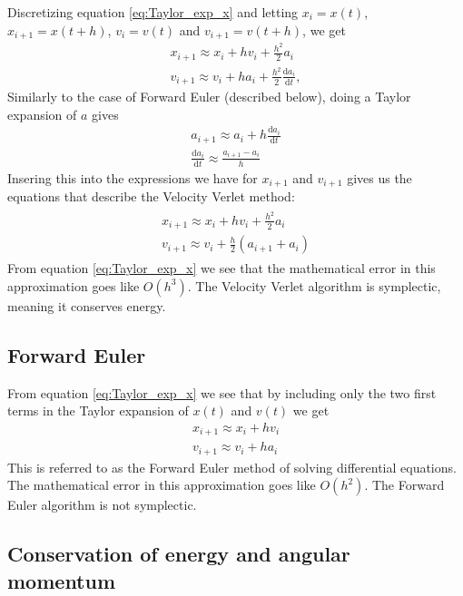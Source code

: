 \documentclass[reprint, english,notitlepage,nofootinbib]{revtex4-1}  %
\begin{document}
Discretizing equation \eqref{eq:Taylor_exp_x} and letting $x_i = x(t)$, $x_{i+1} = x(t + h)$, $v_i = v(t)$ and $v_{i+1} = v(t + h)$, we get
\begin{align*}
  x_{i+1} \approx x_i + h v_i + \frac{h^2}{2} a_i \\
  v_{i+1} \approx v_i + h a_i + \frac{h^2}{2} \frac{\mathrm d a_i}{\mathrm d t},
\end{align*}
Similarly to the case of Forward Euler (described below), doing a Taylor expansion of $a$ gives
\begin{align*}
  a_{i+1} \approx a_i + h \frac{\mathrm d a_i}{\mathrm d t} \\
  \frac{\mathrm d a_i}{\mathrm d t} \approx \frac{a_{i+1} - a_i}{h}
\end{align*}
Insering this into the expressions we have for $x_{i+1}$ and $v_{i+1}$ gives us the equations that describe the Velocity Verlet method:
\begin{align}
\begin{split}
\label{eq:euler}
  x_{i+1} \approx x_i + h v_i + \frac{h^2}{2} a_i \\
  v_{i+1} \approx v_i + \frac{h}{2} (a_{i+1} + a_i)
\end{split}
\end{align}
From equation \eqref{eq:Taylor_exp_x} we see that the mathematical error in this approximation goes like $O(h^3)$. The Velocity Verlet algorithm is symplectic, meaning it conserves energy.


\subsection{Forward Euler}

From equation \eqref{eq:Taylor_exp_x} we see that by including only the two first terms in the Taylor expansion of $x(t)$ and $v(t)$ we get
\begin{align*}
  x_{i+1} \approx x_i + h v_i \\
  v_{i+1} \approx v_i + h a_i
\end{align*}
This is referred to as the Forward Euler method of solving differential equations. The mathematical error in this approximation goes like $O(h^2)$. The Forward Euler algorithm is not symplectic.


\subsection{Conservation of energy and angular momentum}
\end{document}
